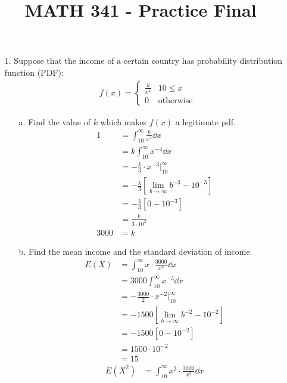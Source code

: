 \documentclass[letterpaper,12pt]{article}
\title{MATH 341 - Practice Final}
\begin{document}
\maketitle
\begin{enumerate}
  \item[1.]
    Suppose that the income of a certain country has probability distribution function (PDF):
    \begin{align*}
      f(x) = \begin{cases}
        \frac{k}{x^4} & 10 \le x \\
        0             & \text{otherwise}
      \end{cases}
    \end{align*}
    \begin{enumerate}
      \item[a.]
        Find the value of $k$ which makes $f(x)$ a legitimate pdf.
        \begin{align*}
          1 &= \int_{10}^{\infty} \frac{k}{x^4} \dd{x} \\
          &= k \int_{10}^{\infty} x^{-4} \dd{x} \\
          &= -\frac{k}{3} \cdot x^{-3} \big\rvert_{10}^{\infty} \\
          &= -\frac{k}{3} \left[\lim_{b \to \infty} b^{-3} - 10^{-3}\right] \\
          &= -\frac{k}{3} [0 - 10^{-3}] \\
          &= \frac{k}{3 \cdot 10^3} \\
          3000 &= k
        \end{align*}
      \item[b.]
        Find the mean income and the standard deviation of income.
        \begin{align*}
          E(X) &= \int_{10}^{\infty} x \cdot \frac{3000}{x^4} \dd{x} \\
          &= 3000 \int_{10}^{\infty} x^{-3} \dd{x} \\
          &= -\frac{3000}{2} \cdot x^{-2} \big\rvert_{10}^{\infty} \\
          &= -1500 \left[\lim_{b \to \infty} b^{-2} - 10^{-2}\right] \\
          &= -1500 [0 - 10^{-2}] \\
          &= 1500 \cdot 10^{-2} \\
          &= 15
        \end{align*}
        \begin{align*}
          E(X^2) &= \int_{10}^{\infty} x^2 \cdot \frac{3000}{x^4} \dd{x} \\

\end{align*}
\end{enumerate}
\end{enumerate}
\end{document}
